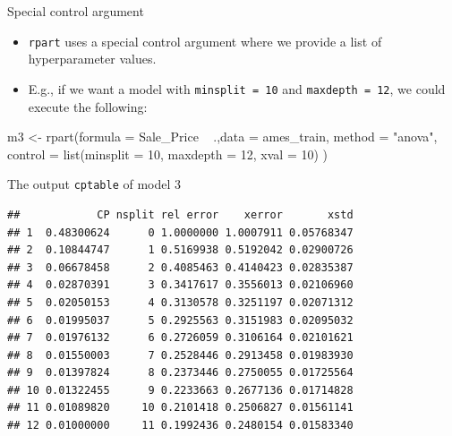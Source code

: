 \documentclass[
  10pt,
  ignorenonframetext,
]{beamer}
\newenvironment{Shaded}{}{}
\newcommand{\DataTypeTok}[1]{#1}
\newcommand{\DecValTok}[1]{#1}
\newcommand{\KeywordTok}[1]{\textcolor[rgb]{0.00,0.00,1.00}{#1}}
\newcommand{\NormalTok}[1]{#1}
\newcommand{\OperatorTok}[1]{#1}
\newcommand{\StringTok}[1]{\textcolor[rgb]{0.00,0.50,0.50}{#1}}
\providecommand{\tightlist}{%
  \setlength{\itemsep}{0pt}\setlength{\parskip}{0pt}}
\begin{document}
\begin{frame}[fragile]{Special control argument}
\protect\hypertarget{special-control-argument}{}

\begin{itemize}
\tightlist
\item
  \texttt{rpart} uses a special control argument where we provide a list
  of hyperparameter values.
\item
  E.g., if we want a model with \texttt{minsplit\ =\ 10} and
  \texttt{maxdepth\ =\ 12}, we could execute the following:
\end{itemize}

\begin{Shaded}
\begin{Highlighting}[]
\NormalTok{m3 <-}\StringTok{ }\KeywordTok{rpart}\NormalTok{(}\DataTypeTok{formula =}\NormalTok{ Sale_Price }\OperatorTok{~}\StringTok{ }\NormalTok{.,}\DataTypeTok{data =}\NormalTok{ ames_train,}
    \DataTypeTok{method  =} \StringTok{"anova"}\NormalTok{, }\DataTypeTok{control =} \KeywordTok{list}\NormalTok{(}\DataTypeTok{minsplit =} \DecValTok{10}\NormalTok{, }
                          \DataTypeTok{maxdepth =} \DecValTok{12}\NormalTok{, }\DataTypeTok{xval =} \DecValTok{10}\NormalTok{)}
\NormalTok{)}
\end{Highlighting}
\end{Shaded}

\end{frame}

\begin{frame}[fragile]{The output \texttt{cptable} of model 3}
\protect\hypertarget{the-output-cptable-of-model-3}{}

\begin{Shaded}
\end{Shaded}

\begin{verbatim}
##            CP nsplit rel error    xerror       xstd
## 1  0.48300624      0 1.0000000 1.0007911 0.05768347
## 2  0.10844747      1 0.5169938 0.5192042 0.02900726
## 3  0.06678458      2 0.4085463 0.4140423 0.02835387
## 4  0.02870391      3 0.3417617 0.3556013 0.02106960
## 5  0.02050153      4 0.3130578 0.3251197 0.02071312
## 6  0.01995037      5 0.2925563 0.3151983 0.02095032
## 7  0.01976132      6 0.2726059 0.3106164 0.02101621
## 8  0.01550003      7 0.2528446 0.2913458 0.01983930
## 9  0.01397824      8 0.2373446 0.2750055 0.01725564
## 10 0.01322455      9 0.2233663 0.2677136 0.01714828
## 11 0.01089820     10 0.2101418 0.2506827 0.01561141
## 12 0.01000000     11 0.1992436 0.2480154 0.01583340
\end{verbatim}

\end{frame}
\end{document}
